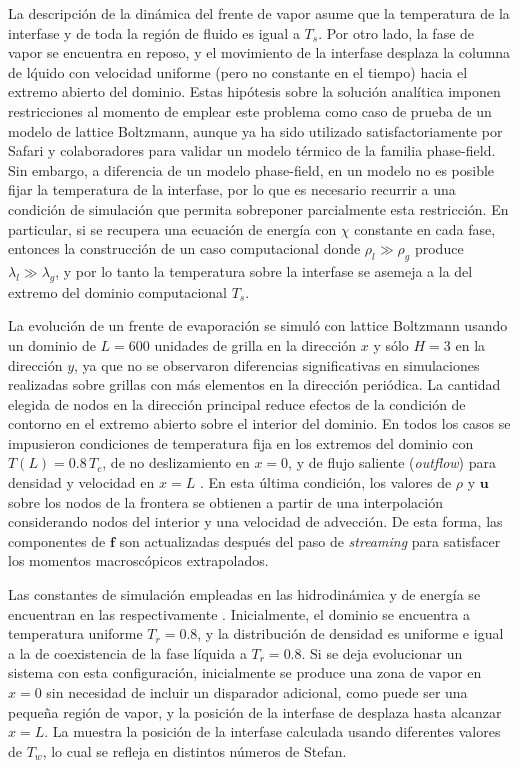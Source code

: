 La descripci\'on de la din\'amica del frente de vapor asume que la temperatura de la interfase y de toda la regi\'on de fluido es igual a $T_s$. Por otro lado, la fase de vapor se encuentra en reposo, y el movimiento de la interfase desplaza la columna de l\'quido con velocidad uniforme (pero no constante en el tiempo) hacia el extremo abierto del dominio. Estas hip\'otesis sobre la soluci\'on anal\'itica imponen restricciones al momento de emplear este problema como caso de prueba de un modelo de lattice Boltzmann, aunque ya ha sido utilizado satisfactoriamente por Safari y colaboradores \cite{safari_consistent_2014} para validar un modelo t\'ermico de la familia phase-field. Sin embargo, a diferencia de un modelo phase-field, en un modelo \pp{} no es posible fijar la temperatura de la interfase, por lo que es necesario recurrir a una condici\'on de simulaci\'on que permita sobreponer parcialmente esta restricci\'on. En particular, si se recupera una ecuaci\'on de energ\'ia con $\chi$ constante en cada fase, entonces la construcci\'on de un caso computacional donde $\rho_l \gg \rho_g$ produce $\lambda_l \gg \lambda_g$, y por lo tanto la temperatura sobre la interfase se asemeja a la del extremo del dominio computacional $T_s$.

La evoluci\'on de un frente de evaporaci\'on se simul\'o con lattice Boltzmann usando un dominio de $L=600$ unidades de grilla en la direcci\'on $x$ y s\'olo $H=3$ en la direcci\'on $y$, ya que no se observaron diferencias significativas en simulaciones realizadas sobre grillas con m\'as elementos en la direcci\'on peri\'odica. La cantidad elegida de nodos en la direcci\'on principal reduce efectos de la condici\'on de contorno en el extremo abierto sobre el interior del dominio. En todos los casos se impusieron condiciones de temperatura fija en los extremos del dominio con $T(L) = 0.8 \, T_c$, de no deslizamiento en $x=0$, y de flujo saliente (\emph{outflow}) para densidad y velocidad en $x=L$ \cite{lou_evaluation_2013}. En esta \'ultima condici\'on, los valores de $\rho$ y $\bm{u}$ sobre los nodos de la frontera se obtienen a partir de una interpolaci\'on considerando nodos del interior y una velocidad de advecci\'on. De esta forma, las componentes de $\bm{f}$ son actualizadas despu\'es del paso de \emph{streaming} para satisfacer los momentos macrosc\'opicos extrapolados.

Las constantes de simulaci\'on empleadas en las \lbe{} hidrodin\'amica y de energ\'ia se encuentran en las \tabs{}{} respectivamente . Inicialmente, el dominio se encuentra a temperatura uniforme $T_r = 0.8$, y la distribuci\'on de densidad es uniforme e igual a la de coexistencia de la fase l\'iquida a $T_r = 0.8$. Si se deja evolucionar un sistema con esta configuraci\'on, inicialmente se produce una zona de vapor en $x=0$ sin necesidad de incluir un disparador adicional, como puede ser una peque\~na regi\'on de vapor, y la posici\'on de la interfase de desplaza hasta alcanzar $x=L$. La  muestra la posici\'on de la interfase calculada usando diferentes valores de $T_w$, lo cual se refleja en distintos n\'umeros de Stefan. 

